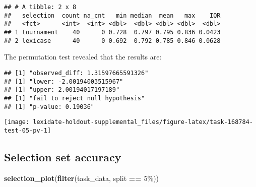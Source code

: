 \documentclass[
]{book}
\newenvironment{Shaded}{\begin{snugshade}}{\end{snugshade}}
\newcommand{\AttributeTok}[1]{\textcolor[rgb]{0.13,0.29,0.53}{#1}}
\newcommand{\DecValTok}[1]{\textcolor[rgb]{0.00,0.00,0.81}{#1}}
\newcommand{\FunctionTok}[1]{\textcolor[rgb]{0.13,0.29,0.53}{\textbf{#1}}}
\newcommand{\NormalTok}[1]{#1}
\newcommand{\OtherTok}[1]{\textcolor[rgb]{0.56,0.35,0.01}{#1}}
\newcommand{\SpecialCharTok}[1]{\textcolor[rgb]{0.81,0.36,0.00}{\textbf{#1}}}
\newcommand{\StringTok}[1]{\textcolor[rgb]{0.31,0.60,0.02}{#1}}
\begin{document}
\begin{verbatim}
## # A tibble: 2 x 8
##   selection  count na_cnt   min median  mean   max    IQR
##   <fct>      <int>  <int> <dbl>  <dbl> <dbl> <dbl>  <dbl>
## 1 tournament    40      0 0.728  0.797 0.795 0.836 0.0423
## 2 lexicase      40      0 0.692  0.792 0.785 0.846 0.0628
\end{verbatim}

The permutation test revealed that the results are:

\begin{Shaded}
\end{Shaded}

\begin{verbatim}
## [1] "observed_diff: 1.31597665591326"
## [1] "lower: -2.00194003515967"
## [1] "upper: 2.00194017197189"
## [1] "fail to reject null hypothesis"
## [1] "p-value: 0.19036"
\end{verbatim}

\texttt{[image: lexidate-holdout-supplemental\_files/figure-latex/task-168784-test-05-pv-1]}

\hypertarget{selection-set-accuracy-50}{%
\subsection{Selection set accuracy}\label{selection-set-accuracy-50}}

\begin{Shaded}
\begin{Highlighting}[]
\FunctionTok{selection\_plot}\NormalTok{(}\FunctionTok{filter}\NormalTok{(task\_data, split }\SpecialCharTok{==} \StringTok{\textquotesingle{}5\%\textquotesingle{}}\NormalTok{))}
\end{Highlighting}
\end{Shaded}
\end{document}
